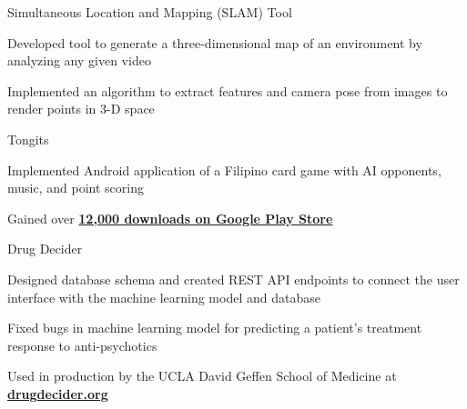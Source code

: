 \documentclass[12pt, letterpaper]{awesome-cv}
\begin{document}
\begin{cventries}
  \cventry
    {} %
    {Simultaneous Location and Mapping (SLAM) Tool} %
    {} %
    {} %
    {
      \vspace{-0.2in}
      \begin{cvitems} %
        \item {Developed tool to generate a three-dimensional map of an environment by analyzing any given video}
		    \item {Implemented an algorithm to extract features and camera pose from images to render points in 3-D space}
      \end{cvitems}
    }

  \cventry
    {} %
    {Tongits} %
    {} %
    {} %
    {
      \vspace{-0.2in}
      \begin{cvitems} %
      	\item {Implemented Android application of a Filipino card game with AI opponents, music, and point scoring}
		    \item 
            Gained over \href{https://play.google.com/store/apps/details?id=com.creativelabs.tongits&hl=en_US/}{\textbf{12,000 downloads on Google Play Store}}
      \end{cvitems}
    }

  \cventry
    {} %
    {Drug Decider} %
    {} %
    {} %
    {
      \vspace{-0.2in}
      \begin{cvitems} %
      	\item {Designed database schema and created REST API endpoints to connect the user interface with the machine learning model and database}
		    \item {Fixed bugs in machine learning model for predicting a patient’s treatment response to anti-psychotics}
        \item
            Used in production by the UCLA David Geffen School of Medicine at \href{https://drugdecider.org}{\textbf{drugdecider.org}}
      \end{cvitems}
    }

\end{cventries}
\end{document}
